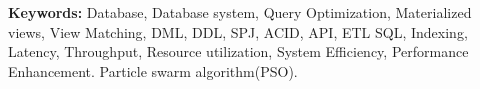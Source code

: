 
\noindent \textbf{Keywords:} Database, Database system, Query Optimization, Materialized views, View Matching, DML, DDL, SPJ, ACID, API, ETL SQL, Indexing, Latency, Throughput, Resource utilization, System Efficiency, Performance Enhancement. Particle swarm algorithm(PSO).

 

